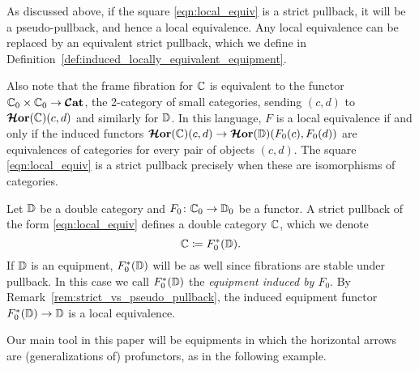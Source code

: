 \documentclass[11pt,oneside,article]{memoir}
\begin{document}
\begin{remark}
    \label{rem:strict_vs_pseudo_pullback}
  As discussed above, if the square \eqref{eqn:local_equiv} is a strict pullback, it will be a
  pseudo-pullback, and hence a local equivalence. Any local equivalence can be replaced by an
  equivalent strict pullback, which we define in
  Definition~\ref{def:induced_locally_equivalent_equipment}.

  Also note that the frame fibration for $\mathbb{C}$ is equivalent to the functor
  $\mathbb{C}_0\times\mathbb{C}_0\to\bm{\mathcal{C}}\mathbf{at}$, the 2-category of small categories, sending $(c,d)$ to
  $\bm{\mathcal{H}}\mathbf{or}(\mathbb{C})(c,d)$ and similarly for $\mathbb{D}$. In this language, $F$ is a local equivalence
  if and only if the induced functors $\bm{\mathcal{H}}\mathbf{or}(\mathbb{C})(c,d)\to\bm{\mathcal{H}}\mathbf{or}(\mathbb{D})(F_0(c),F_0(d))$ are
  equivalences of categories for every pair of objects $(c,d)$. The square \eqref{eqn:local_equiv}
  is a strict pullback precisely when these are isomorphisms of categories.
\end{remark}

\begin{definition}
    \label{def:induced_locally_equivalent_equipment}
  Let $\mathbb{D}$ be a double category and $F_0\colon\mathbb{C}_0\to\mathbb{D}_0$ be a functor. A strict
  pullback of the form \eqref{eqn:local_equiv} defines a double category $\mathbb{C}$, which we denote
  \[
    \mathbb{C}\coloneqq F_0^*(\mathbb{D}).
  \]
  If $\mathbb{D}$ is an equipment, $F_0^*(\mathbb{D})$ will be as well since fibrations are stable under
  pullback. In this case we call $F_0^*(\mathbb{D})$ the \emph{equipment induced by $F_0$}. By
  Remark~\ref{rem:strict_vs_pseudo_pullback}, the induced equipment functor
  $F_0^*(\mathbb{D})\to\mathbb{D}$ is a local equivalence.
\end{definition}

Our main tool in this paper will be equipments in which the horizontal arrows are (generalizations
of) profunctors, as in the following example.
\end{document}
